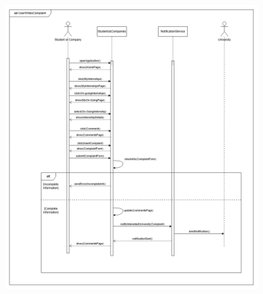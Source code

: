 \documentclass{article}
\begin{document}
\begin{figure}[H]
    \centering
    \includegraphics[scale = 0.75]{figures/UseCasesSD/UserWritesComplaintSD.png}
\end{figure}
\end{document}
